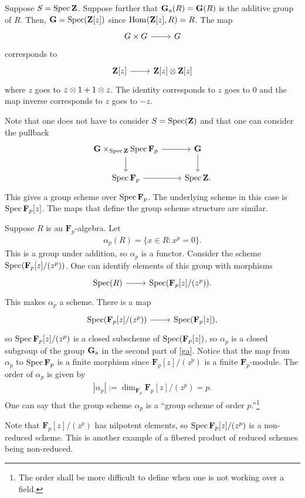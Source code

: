 \documentclass [11 pt, oneside] {article}
\begin{document}
\begin{example}[ ]\label{ga}\text{}
Suppose $S=\operatorname{Spec} \mathbf{Z}$. Suppose further that $\mathbf{G}\textsubscript{a}(R)=\mathbf{G}(R)$ is the additive group of $R$. 
Then, $\mathbf{G}=\operatorname{Spec} (\mathbf{Z}[z])$ since $\operatorname{Hom}_{}(\mathbf{Z}[z], R)=R$. The map 
\[
\begin{tikzcd}
G\times G\ar[r]& G
\end{tikzcd}
\]
corresponds to
 \[
\begin{tikzcd}
\Z[z]\ar[r]& \Z[z]\tensor\Z[z]
\end{tikzcd}
\]
where $z$ goes to $z\otimes 1 + 1\otimes z$. The identity corresponds to $z$ goes to $0$ and the map inverse corresponds to $z$ goes to $-z$.

Note that one does not have to consider $S=\operatorname{Spec} (\mathbf{Z})$ and that one can consider the pullback
\[
\begin{tikzcd}
	\mathbf{G}\times_{\Spec \mathbf{Z}} \Spec \mathbf{F}_{p} \ar[r]\ar[d] & \mathbf{G}\ar[d]\\
	\Spec \mathbf{F}_{p} \ar[r] & \Spec \mathbf{Z}.
\end{tikzcd}
\]
This gives a group scheme over $\operatorname{Spec} \mathbf{F}_{p}$. The underlying scheme in this case is $\operatorname{Spec} \mathbf{F}_{p}[z]$. The maps that define the group scheme structure are similar.
\end{example}

\begin{example}[ ]\label{}\text{}
Suppose $R$ is an $\mathbf{F}_{p}$-algebra. Let 
\begin{align*}
	\alpha_p(R) = \{ x\in R : x^p =0\}.
\end{align*}
This is a group under addition, so $\alpha_p$ is a functor. Consider the scheme $\operatorname{Spec} (\mathbf{F}_{p}[z]/(z^p))$. One can identify elements of this group with morphisms 
\[
\begin{tikzcd}
\Spec(R)\ar[r]& \Spec(\F_p[z]/(z^p)).
\end{tikzcd}
\]
This makes $\alpha_p$ a scheme. There is a map 
\[
\begin{tikzcd}
\Spec (\mathbf{F}_{p}[z]/(z^p)) \ar[r]& \Spec (\mathbf{F}_{p}[z]),
\end{tikzcd}
\]
so $\operatorname{Spec} \mathbf{F}_{p}[z]/(z^p)$ is a closed subscheme of $\operatorname{Spec}( \mathbf{F}_{p}[z])$, so $\alpha_p$ is a closed subgroup of the group $\mathbf{G} \textsubscript{a}$ in the second part of \cref{ga}. Notice that the map from $\alpha_p$ to $\operatorname{Spec} \mathbf{F}_{p}$ is a finite morphism since $\mathbf{F}_{p}[z]/(z^p)$ is a finite $\mathbf{F}_{p}$-module. The order of $\alpha_p$ is given by
\begin{align*}
	\left\lvert \alpha_p \right\rvert := \dim_{\mathbf{F}_{p}} \mathbf{F}_{p}[z]/(z^p) =p.
\end{align*}
One can say that the group scheme $\alpha_p$ is a ``group scheme of order $p$.''\footnote{The order shall be more difficult to define when one is not working over a field.}

Note that $\mathbf{F}_{p}[z]/(z^p)$ has nilpotent elements, so $\operatorname{Spec} \mathbf{F}_{p}[z]/(z^p)$ is a non-reduced scheme. This is another example of a fibered product of reduced schemes being non-reduced.
\end{example}
\end{document}

